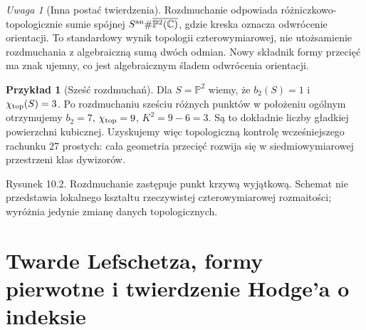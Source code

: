 \documentclass[11pt,a4paper,openany]{report}
\numberwithin{equation}{section}
\theoremstyle{plain}
\theoremstyle{definition}
\newtheorem{przyklad}[twierdzenie]{Przykład}
\theoremstyle{remark}
\newtheorem{uwaga}[twierdzenie]{Uwaga}
\newcommand{\C}{\mathbb C}
\newcommand{\PP}{\mathbb P}
\begin{document}
\begin{uwaga}[Inna postać twierdzenia]
Rozdmuchanie odpowiada różniczkowo-topologicznie sumie
spójnej $S^{\rm an}\#\overline{\PP^2(\C)}$,
gdzie kreska oznacza odwrócenie orientacji.
To standardowy wynik topologii czterowymiarowej,
nie utożsamienie rozdmuchania z algebraiczną sumą dwóch
odmian. Nowy składnik formy przecięć ma znak ujemny,
co jest algebraicznym śladem odwrócenia orientacji.
\end{uwaga}

\begin{przyklad}[Sześć rozdmuchań]
Dla $S=\PP^2$ wiemy, że $b_2(S)=1$ i
$\chi_{\rm top}(S)=3$. Po rozdmuchaniu sześciu
różnych punktów w położeniu ogólnym otrzymujemy
$b_2=7$, $\chi_{\rm top}=9$, $K^2=9-6=3$.
Są to dokładnie liczby gładkiej powierzchni kubicznej.
Uzyskujemy więc topologiczną kontrolę wcześniejszego
rachunku 27 prostych: cała geometria przecięć rozwija się
w siedmiowymiarowej przestrzeni klas dywizorów.
\end{przyklad}

\begin{center}

{\small Rysunek 10.2. Rozdmuchanie zastępuje punkt krzywą wyjątkową.
Schemat nie przedstawia lokalnego kształtu rzeczywistej czterowymiarowej
rozmaitości; wyróżnia jedynie zmianę danych topologicznych.}\par
\end{center}

\section{Twarde Lefschetza, formy pierwotne i twierdzenie Hodge'a o indeksie}
\label{sec:ga10-hard-index}
\end{document}
